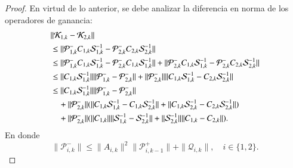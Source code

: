 \begin{proof}
En virtud de lo anterior, se debe analizar la diferencia en norma de los operadores de ganancia:
\begin{equation*}
	\begin{aligned}
		& \| \mathcal{K}_{1,k}  - \mathcal{K}_{2,k} \| \\
		& \leq \| \mathcal{P}_{1,k}^- C_{1,k}\mathcal{S}_{1,k}^{-1} -  \mathcal{P}_{2,k}^- C_{2,k} \mathcal{S}_{2,k}^{-1} \| \\
		& \leq \| \mathcal{P}_{1,k}^- C_{1,k}\mathcal{S}_{1,k}^{-1} - \mathcal{P}_{2,k}^- C_{1,k}\mathcal{S}_{1,k}^{-1} \| + \| \mathcal{P}_{2,k}^- C_{1,k}\mathcal{S}_{1,k}^{-1} - \mathcal{P}_{2,k}^- C_{2,k}\mathcal{S}_{2,k}^{-1} \| \\
		& \leq \| C_{1,k}\mathcal{S}_{1,k}^{-1} \| \| \mathcal{P}_{1,k}^- - \mathcal{P}_{2,k}^-\| + \| \mathcal{P}_{2,k}^- \| \|  C_{1,k}\mathcal{S}_{1,k}^{-1} -  C_{2,k}\mathcal{S}_{2,k}^{-1}\| \\
		& \leq \| C_{1,k}\mathcal{S}_{1,k}^{-1} \| \| \mathcal{P}_{1,k}^- - \mathcal{P}_{2,k}^-\| \\
		& \quad + \| \mathcal{P}_{2,k}^- \| ( \|  C_{1,k}\mathcal{S}_{1,k}^{-1} -  C_{1,k}\mathcal{S}_{2,k}^{-1}\| + \|  C_{1,k}\mathcal{S}_{2,k}^{-1} -  C_{2,k}\mathcal{S}_{2,k}^{-1}\|) \\
		& \quad + \| \mathcal{P}_{2,k}^- \| ( \|  C_{1,k} \| \| \mathcal{S}_{1,k}^{-1} -  \mathcal{S}_{2,k}^{-1}\| + \| \mathcal{S}_{2,k}^{-1} \| \| C_{1,k} -  C_{2,k}\|).
	\end{aligned}
\end{equation*}
En donde
\begin{equation*}
	\| \mathcal{P}_{i,k}^- \|  \leq \| A_{i,k} \|^2 \| \mathcal{P}_{i,k-1}^+\| + \| \mathcal{Q}_{i,k}\|, \quad i \in \{ 1, 2 \}.
\end{equation*}


\end{proof}
